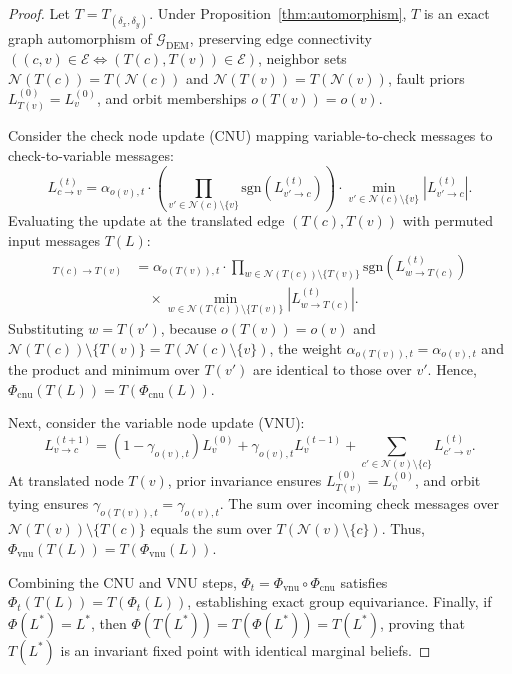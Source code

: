 \documentclass[journal]{IEEEtran}
\begin{document}
\begin{proof}
Let $T = T_{(\delta_x, \delta_y)}$. Under Proposition~\ref{thm:automorphism}, $T$ is an exact graph automorphism of $\mathcal{G}_{\text{DEM}}$, preserving edge connectivity $((c, v) \in \mathcal{E} \iff (T(c), T(v)) \in \mathcal{E})$, neighbor sets $\mathcal{N}(T(c)) = T(\mathcal{N}(c))$ and $\mathcal{N}(T(v)) = T(\mathcal{N}(v))$, fault priors $L_{T(v)}^{(0)} = L_v^{(0)}$, and orbit memberships $o(T(v)) = o(v)$.

Consider the check node update (CNU) mapping variable-to-check messages to check-to-variable messages:
\begin{equation}
    L_{c \to v}^{(t)} = \alpha_{o(v), t} \cdot \left( \prod_{v' \in \mathcal{N}(c) \setminus \{v\}} \text{sgn}(L_{v' \to c}^{(t)}) \right) \cdot \min_{v' \in \mathcal{N}(c) \setminus \{v\}} |L_{v' \to c}^{(t)}|.
\end{equation}
Evaluating the update at the translated edge $(T(c), T(v))$ with permuted input messages $T(L)$:
\begin{align}
    [T(\Phi_{\text{cnu}}(L))]_{T(c) \to T(v)} &= \alpha_{o(T(v)), t} \cdot \prod_{w \in \mathcal{N}(T(c)) \setminus \{T(v)\}} \text{sgn}(L_{w \to T(c)}^{(t)}) \nonumber \\
    &\quad \times \min_{w \in \mathcal{N}(T(c)) \setminus \{T(v)\}} |L_{w \to T(c)}^{(t)}|.
\end{align}
Substituting $w = T(v')$, because $o(T(v)) = o(v)$ and $\mathcal{N}(T(c)) \setminus \{T(v)\} = T(\mathcal{N}(c) \setminus \{v\})$, the weight $\alpha_{o(T(v)), t} = \alpha_{o(v), t}$ and the product and minimum over $T(v')$ are identical to those over $v'$. Hence, $\Phi_{\text{cnu}}(T(L)) = T(\Phi_{\text{cnu}}(L))$.

Next, consider the variable node update (VNU):
\begin{equation}
    L_{v \to c}^{(t+1)} = (1 - \gamma_{o(v), t}) L_v^{(0)} + \gamma_{o(v), t} L_v^{(t-1)} + \sum_{c' \in \mathcal{N}(v) \setminus \{c\}} L_{c' \to v}^{(t)}.
\end{equation}
At translated node $T(v)$, prior invariance ensures $L_{T(v)}^{(0)} = L_v^{(0)}$, and orbit tying ensures $\gamma_{o(T(v)), t} = \gamma_{o(v), t}$. The sum over incoming check messages over $\mathcal{N}(T(v)) \setminus \{T(c)\}$ equals the sum over $T(\mathcal{N}(v) \setminus \{c\})$. Thus, $\Phi_{\text{vnu}}(T(L)) = T(\Phi_{\text{vnu}}(L))$.

Combining the CNU and VNU steps, $\Phi_t = \Phi_{\text{vnu}} \circ \Phi_{\text{cnu}}$ satisfies $\Phi_t(T(L)) = T(\Phi_t(L))$, establishing exact group equivariance. Finally, if $\Phi(L^*) = L^*$, then $\Phi(T(L^*)) = T(\Phi(L^*)) = T(L^*)$, proving that $T(L^*)$ is an invariant fixed point with identical marginal beliefs.
\end{proof}
\end{document}
